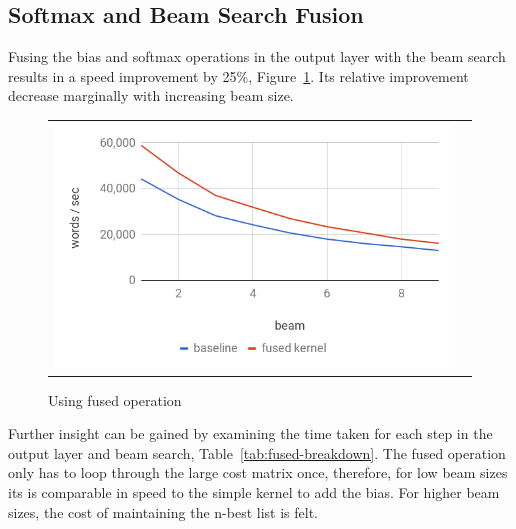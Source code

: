 \documentclass[11pt,a4paper]{article}
\begin{document}
\subsection{Softmax and Beam Search Fusion}

Fusing the bias and softmax operations in the output layer with the beam search results in a speed improvement by 25\%, Figure~\ref{fig:fused}. Its relative improvement decrease marginally with increasing beam size.

\begin{figure}
\centering
\begin{tabular}{cc}
{\includegraphics[scale=0.3]{fused.png}} 
\end{tabular}
\caption{Using fused operation}
\label{fig:fused}
\end{figure} 

Further insight can be gained by examining the time taken for each step in the output layer and beam search, Table~\ref{tab:fused-breakdown}. The fused operation only has to loop through the large cost matrix once, therefore, for low beam sizes its is comparable in speed to the simple kernel to add the bias. For higher beam sizes, the cost of maintaining the n-best list is felt.
\end{document}
